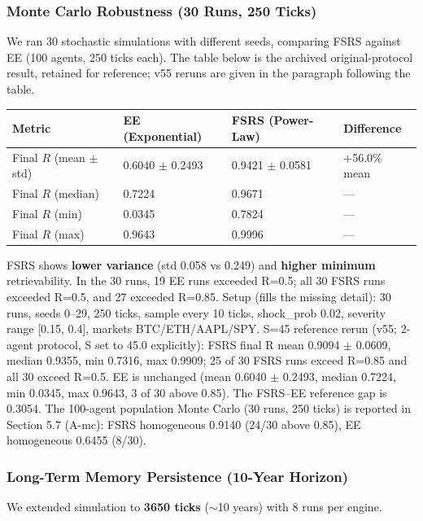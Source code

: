 \documentclass[11pt]{article}
\begin{document}
\subsubsection{Monte Carlo Robustness (30 Runs, 250 Ticks)}
We ran 30 stochastic simulations with different seeds, comparing FSRS against EE (100 agents, 250 ticks each). The table below is the archived original-protocol result, retained for reference; v55 reruns are given in the paragraph following the table.

\begin{table}[htbp]
\centering
\begin{tabular}{llll}
\toprule
\textbf{Metric} & \textbf{EE (Exponential)} & \textbf{FSRS (Power-Law)} & \textbf{Difference} \\
\midrule
Final $R$ (mean $\pm$ std) & 0.6040 $\pm$ 0.2493 & 0.9421 $\pm$ 0.0581 & +56.0\% mean \\
Final $R$ (median) & 0.7224 & 0.9671 & --- \\
Final $R$ (min) & 0.0345 & 0.7824 & --- \\
Final $R$ (max) & 0.9643 & 0.9996 & --- \\
\bottomrule
\end{tabular}
\end{table}

FSRS shows \textbf{lower variance} (std 0.058 vs 0.249) and \textbf{higher minimum} retrievability. In the 30 runs, 19 EE runs exceeded R=0.5; all 30 FSRS runs exceeded R=0.5, and 27 exceeded R=0.85. Setup (fills the missing detail): 30 runs, seeds 0--29, 250 ticks, sample every 10 ticks, shock\_prob 0.02, severity range [0.15, 0.4], markets BTC/ETH/AAPL/SPY. S=45 reference rerun (v55; 2-agent protocol, S set to 45.0 explicitly): FSRS final R mean 0.9094 $\pm$ 0.0609, median 0.9355, min 0.7316, max 0.9909; 25 of 30 FSRS runs exceed R=0.85 and all 30 exceed R=0.5. EE is unchanged (mean 0.6040 $\pm$ 0.2493, median 0.7224, min 0.0345, max 0.9643, 3 of 30 above 0.85). The FSRS--EE reference gap is 0.3054. The 100-agent population Monte Carlo (30 runs, 250 ticks) is reported in Section 5.7 (A-mc): FSRS homogeneous 0.9140 (24/30 above 0.85), EE homogeneous 0.6455 (8/30).

\subsubsection{Long-Term Memory Persistence (10-Year Horizon)}
We extended simulation to \textbf{3650 ticks} ($\sim$10 years) with 8 runs per engine.
\end{document}
